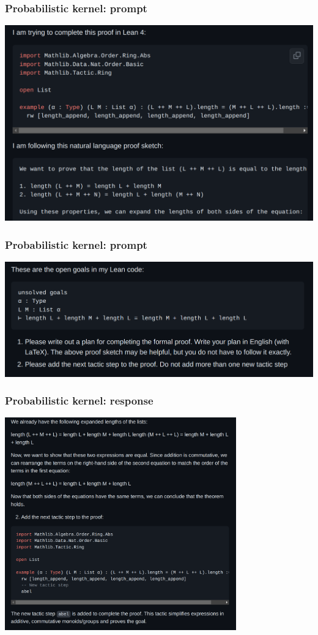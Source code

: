 \documentclass{beamer}
\begin{document}
\begin{frame}
\frametitle{Probabilistic kernel: prompt}
\begin{center}
    \includegraphics[width=1\textwidth]{img/s1.png}
\end{center}
\end{frame}
\begin{frame}
\frametitle{Probabilistic kernel: prompt}
\begin{center}
    \includegraphics[width=1\textwidth]{img/s2.png}
\end{center}
\end{frame}
\begin{frame}
\frametitle{Probabilistic kernel: response}
\begin{center}
    \includegraphics[width=0.75\textwidth]{img/s3.png}
\end{center}
\end{frame}
\end{document}
